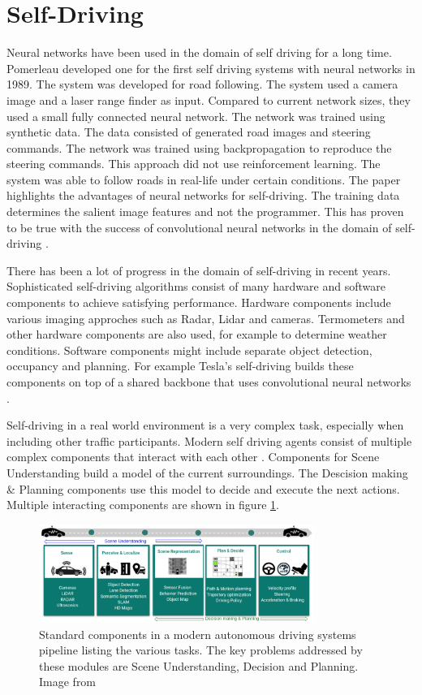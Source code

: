 \section{Self-Driving}

Neural networks have been used in the domain of self driving for a long time. Pomerleau \autocite{alvinn} developed one for the first self driving systems with neural networks in 1989. The system was developed for road following. The system used a camera image and a laser range finder as input. Compared to current network sizes, they used a small fully connected neural network. The network was trained using synthetic data. The data consisted of generated road images and steering commands. The network was trained using backpropagation to reproduce the steering commands. This approach did not use reinforcement learning. The system was able to follow roads in real-life under certain conditions.
The paper highlights the advantages of neural networks for self-driving. The training data determines the salient image features and not the programmer. This has proven to be true with the success of convolutional neural networks in the domain of self-driving \autocite{neptune}.


There has been a lot of progress in the domain of self-driving in recent years. Sophisticated self-driving algorithms consist of many hardware and software components to achieve satisfying performance. Hardware components include various imaging approches such as Radar, Lidar and cameras. Termometers and other hardware components are also used, for example to determine weather conditions. 
Software components might include separate object detection, occupancy and planning. For example Tesla's self-driving builds these components on top of a shared backbone that uses convolutional neural networks \autocite{howteslaautopilot}.

Self-driving in a real world environment is a very complex task, especially when including other traffic participants. Modern self driving agents consist of multiple complex components that interact with each other \autocite{drl_for_ad}. Components for Scene Understanding build a model of the current surroundings. The Descision making \& Planning components use this model to decide and execute the next actions.
Multiple interacting components are shown in figure \ref{fig:ad_components}.

\begin{figure}
    \centering
    \includegraphics[width=0.8\textwidth]{Bilder/ad_components_from_paper_drl_for_ad.png}
    \caption{Standard components in a modern autonomous driving systems pipeline listing the various tasks. The key problems addressed by these modules are Scene Understanding, Decision and Planning. Image from \autocite{drl_for_ad}}
    \label{fig:ad_components}
\end{figure}

